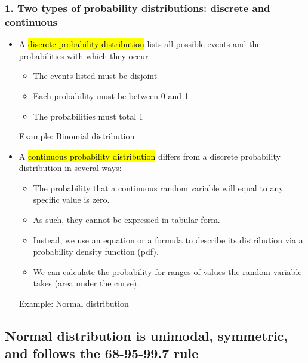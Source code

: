 \documentclass[slidestop,compress,mathserif,10pt,t,professionalfonts,xcolor=table]{beamer}
\begin{document}

\begin{frame}
\frametitle{1. Two types of probability distributions: discrete and continuous}

\begin{itemize}

\item A \hl{discrete probability distribution} lists all possible events and the probabilities with 
which they occur
\begin{itemize}
\item The events listed must be disjoint
\item Each probability must be between 0 and 1 
\item The probabilities must total 1
\end{itemize}
Example: Binomial distribution

\pause

\item A \hl{continuous probability distribution} differs from a discrete probability distribution in 
several ways:
\begin{itemize}
\item The probability that a continuous random variable will equal to any specific value is zero.
\item As such, they cannot be expressed in tabular form.
\item Instead, we use an equation or a formula to describe its distribution via a probability density 
function (pdf).
\item We can calculate the probability for ranges of values the random variable takes (area under 
the curve).
\end{itemize}
Example: Normal distribution

\end{itemize}

\end{frame}


\subsection{Normal distribution is unimodal, symmetric, and follows the 68-95-99.7 rule}
\label{mi2}

\end{document}

